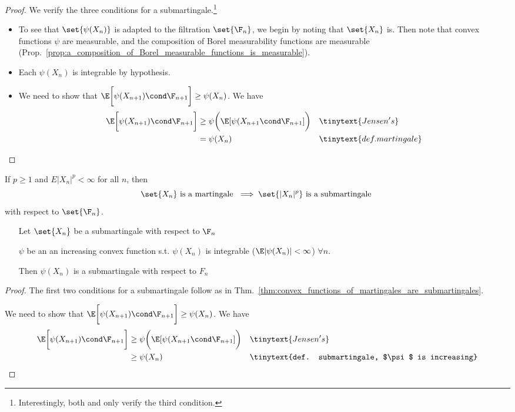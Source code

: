\documentclass{article} %
\begin{document}
\begin{proof}
We verify the three conditions for a submartingale.\footnote{Interestingly, both \citet{durrett2010probability} and \citet{ash2000probability} only verify the third condition.}
%
\begin{itemize}
\item To see that $\set{\psi(X_n)}$ is adapted to the filtration $\set{\F_n}$, we begin by noting that $\set{X_n}$ is.  Then note that convex functions $\psi$ are measurable, and the composition of Borel measurability functions are measurable (Prop.~\ref {prop:a_composition_of_Borel_measurable_functions_is_measurable}).
\item Each $\psi(X_n)$ is integrable by hypothesis. 
\item We need to show that $\E \bigg[\psi(X_{n+1}) \cond \F_{n+1}\bigg] \geq 	\psi(X_n)$.  We have
%
\begin{align*}
\E \bigg[\psi(X_{n+1}) \cond \F_{n+1}\bigg] & \geq \psi \bigg(\E[\psi(X_{n+1} \cond \F_{n+1}] \bigg) && \tinytext{Jensen's} \\
&= \psi(X_n) && \tinytext{def. martingale}
\end{align*}	
\end{itemize}
%
\end{proof}

\begin{corollary}
If $p \geq 1$ and $E|X_n|^p < \infty$ for all $n$, then 
\[ \set{X_n} \text{ is a martingale } \implies   \set{|X_n|^p}  \text{ is a submartingale }\]
with respect to $\set{\F_n}$.
\end{corollary}
 
\begin{theorem} 
%
\begin{itemize}[leftmargin=2.0cm,labelsep=0.5cm]
\item[] %
\item[Let] $\set{X_n}$ be a submartingale with respect to $\F_n$
\item[\phantom{Let}] $\psi$ be an an increasing convex function s.t. $\psi(X_n)$ is integrable ($\E|\psi(X_n)| < \infty$) \quad $\forall n$.
\item[Then] $\psi(X_n)$ is a submartingale with respect to $F_n$
\end{itemize}
\label{thm:increasing_convex_functions_of_submartingales_are_submartingales}
\end{theorem}

\begin{proof}
The first two conditions for a submartingale follow as in Thm.~\ref{thm:convex_functions_of_martingales_are_submartingales}.

 We need to show that $\E \bigg[\psi(X_{n+1}) \cond \F_{n+1}\bigg] \geq 	\psi(X_n)$.  We have
%
\begin{align*}
\E \bigg[\psi(X_{n+1}) \cond \F_{n+1}\bigg] & \geq \psi \bigg(\E[\psi(X_{n+1} \cond \F_{n+1}] \bigg) && \tinytext{Jensen's} \\
& \geq \psi(X_n) && \tinytext{def. submartingale, $\psi$ is  increasing}
\end{align*}	
%
\end{proof}
\end{document}
